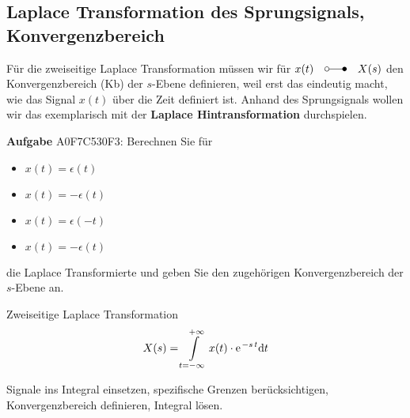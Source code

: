 \documentclass[11pt,a4paper,DIV=12]{scrartcl}
\numberwithin{equation}{section}
\numberwithin{figure}{section}
\newcommand\fsd{\mathrm{d}} %
\begin{document}
\subsection{Laplace Transformation des Sprungsignals, Konvergenzbereich}
\label{sec:A0F7C530F3}
\begin{Ziel}
Für die zweiseitige Laplace Transformation müssen wir für
$x(t) \quad \laplace \quad X(s)$
den Konvergenzbereich (Kb) der $s$-Ebene definieren, weil erst das eindeutig
macht, wie das Signal $x(t)$ über die Zeit definiert ist.
Anhand des Sprungsignals wollen wir das exemplarisch mit der
\textbf{Laplace Hintransformation} durchspielen.
\end{Ziel}
\textbf{Aufgabe} {\tiny A0F7C530F3}: Berechnen Sie für
\begin{itemize}
  \item $x(t)=\epsilon(t)$
  \item $x(t)=-\epsilon(t)$
  \item $x(t)=\epsilon(-t)$
  \item $x(t)=-\epsilon(t)$
\end{itemize}
die Laplace Transformierte und geben Sie den zugehörigen Konvergenzbereich
der $s$-Ebene an.
\begin{Werkzeug}
Zweiseitige Laplace Transformation
\begin{align}
X(s) = \int\limits_{t=-\infty}^{+\infty} x(t) \cdot \e^{-s\,t} \fsd t
\end{align}
\end{Werkzeug}
\begin{Ansatz}
Signale ins Integral einsetzen, spezifische Grenzen berücksichtigen,
Konvergenzbereich definieren, Integral lösen.
\end{Ansatz}
\end{document}
